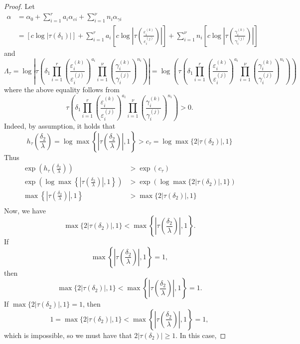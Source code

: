 \begin{proof}
Let 
\begin{align*}
\alpha	
	& = \alpha_0+\sum_{i = 1}^r a_i \alpha_{\varepsilon i} + \sum_{i = 1}^{\nu} n_i \alpha_{\gamma i}\\
	& = [c\log|\tau(\delta_1)|] +\sum_{i = 1}^r a_i \left[c\log\left|\tau\left(\frac{\varepsilon_i^{(k)}}{\varepsilon_i^{(j)}}\right)\right|\right] + \sum_{i = 1}^{\nu} n_i \left[c\log\left|\tau\left(\frac{\gamma_i^{(k)}}{\gamma_i^{(j)}}\right)\right|\right]
\end{align*}
and
\[\Lambda_{\tau} = \log\left|\tau\left(\delta_1 \prod_{i = 1}^r\left( \frac{\varepsilon_i^{(k)}}{\varepsilon_i^{(j)}}\right)^{a_i}\prod_{i = 1}^{\nu} \left( \frac{\gamma_i^{(k)}}{\gamma_i^{(j)}}\right)^{n_i}\right)\right|= \log\left(\tau\left(\delta_1 \prod_{i = 1}^r\left( \frac{\varepsilon_i^{(k)}}{\varepsilon_i^{(j)}}\right)^{a_i}\prod_{i = 1}^{\nu} \left( \frac{\gamma_i^{(k)}}{\gamma_i^{(j)}}\right)^{n_i}\right)\right) \]
where the above equality follows from 
\[\tau\left(\delta_1 \prod_{i = 1}^r\left( \frac{\varepsilon_i^{(k)}}{\varepsilon_i^{(j)}}\right)^{a_i}\prod_{i = 1}^{\nu} \left( \frac{\gamma_i^{(k)}}{\gamma_i^{(j)}}\right)^{n_i}\right) > 0.\]
Indeed, by assumption, it holds that 
\[ h_{\tau}\left(\frac{\delta_2}{\lambda}\right) = \log \max \left\{ \left|\tau\left(\frac{\delta_2}{\lambda}\right)\right|, 1\right\} > c_\tau = \log \max\{2|\tau(\delta_2)|,1\}\]
Thus
\begin{align*}
\exp\left(h_{\tau}\left(\frac{\delta_2}{\lambda}\right)\right)	& > \exp(c_{\tau}) \\
\exp\left(\log \max \left\{ \left|\tau\left(\frac{\delta_2}{\lambda}\right)\right|, 1\right\}\right) & > \exp \left(\log \max\{2|\tau(\delta_2)|,1\}\right)\\
\max \left\{ \left|\tau\left(\frac{\delta_2}{\lambda}\right)\right|, 1\right\} & > \max\{2|\tau(\delta_2)|,1\}\\
\end{align*}
Now, we have
\[\max\{2|\tau(\delta_2)|,1\} < \max \left\{ \left|\tau\left(\frac{\delta_2}{\lambda}\right)\right|, 1\right\}.\]
If  
\[\max \left\{ \left|\tau\left(\frac{\delta_2}{\lambda}\right)\right|, 1\right\} = 1,\]
then
\[\max\{2|\tau(\delta_2)|,1\} < \max \left\{ \left|\tau\left(\frac{\delta_2}{\lambda}\right)\right|, 1\right\} = 1.\]
If $\max\{2|\tau(\delta_2)|,1\} = 1$, then
\[1 = \max\{2|\tau(\delta_2)|,1\} < \max \left\{ \left|\tau\left(\frac{\delta_2}{\lambda}\right)\right|, 1\right\} = 1,\]
which is impossible, so we must have that $2|\tau(\delta_2)| \geq 1$. In this case, 

\end{proof}
